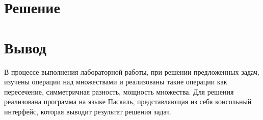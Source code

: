 \documentclass[a4paper,14pt]{extarticle}
\begin{document}
  \section*{Решение}
  
  \section*{Вывод}
  В процессе выполнения лабораторной работы, при решении предложенных задач, изучены операции над множествами и реализованы такие операции как пересечение, симметричная разность, мощность множества. Для решения реализована программа на языке Паскаль, представляющая из себя консольный интерфейс, которая выводит результат решения задач.
\end{document}

